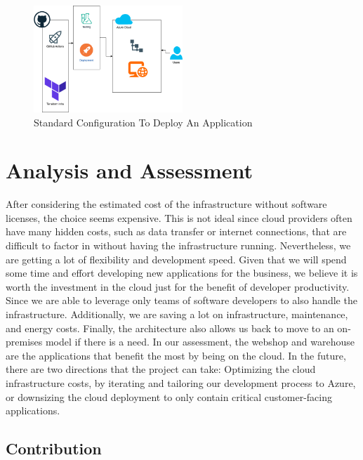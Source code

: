 \documentclass{llncs}
\begin{document}
\begin{figure}[htbp]
    \begin{center}
        \includegraphics[width=0.5\textwidth]{diagrams/AppStandard.drawio.png}
        \vspace{0.01\textwidth}
        \caption{Standard Configuration To Deploy An Application}
        \label{CloudStandard} %
    \end{center}
\end{figure}

\section{Analysis and Assessment}

After considering the estimated cost of the infrastructure without software licenses, the choice seems expensive.
This is not ideal since cloud providers often have many hidden costs, such as data transfer or internet connections, that are difficult to factor in without having the infrastructure running.
Nevertheless, we are getting a lot of flexibility and development speed.
Given that we will spend some time and effort developing new applications for the business, we believe it is worth the investment in the cloud just for the benefit of developer productivity.
Since we are able to leverage only teams of software developers to also handle the infrastructure. Additionally, we are saving a lot on infrastructure, maintenance, and energy costs.
Finally, the architecture also allows us back to move to an on-premises model if there is a need. In our assessment, the webshop and warehouse are the applications that benefit the most by being on the cloud.
In the future, there are two directions that the project can take: Optimizing the cloud infrastructure costs, by iterating and tailoring our development process to Azure, or downsizing the cloud deployment to only contain critical customer-facing applications.

\subsection*{Contribution}
\end{document}
